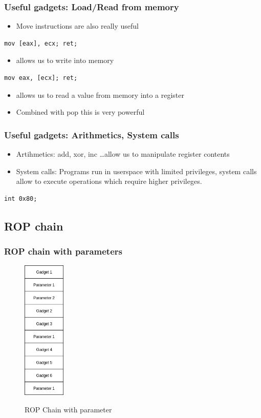 \documentclass[11pt]{beamer}
\begin{document}
\begin{frame}[fragile]
    \frametitle{Useful gadgets: Load/Read from memory}
    \begin{itemize}
        \item Move instructions are also really useful
    \end{itemize}
\begin{lstlisting}[style=result]
mov [eax], ecx; ret;
\end{lstlisting}
    \begin{itemize}
        \item allows us to write into memory
    \end{itemize}
\begin{lstlisting}[style=result]
mov eax, [ecx]; ret;
\end{lstlisting}
    \begin{itemize}
        \item allows us to read a value from memory into a register
        \item Combined with pop this is very powerful
    \end{itemize}
\end{frame}

\begin{frame}[fragile]
    \frametitle{Useful gadgets: Arithmetics, System calls}
    \begin{itemize}
        \item Artihmetics: add, xor, inc \ldots allow us to manipulate register contents
        \item System calls: Programs run in userspace with limited privileges, system calls allow to execute operations which require higher privileges.
    \end{itemize}
\begin{lstlisting}[style=result]
int 0x80;
\end{lstlisting}
\end{frame}
\subsection{ROP chain}
\begin{frame}
    \frametitle{ROP chain with parameters}
    \begin{figure}[h]
        \caption{ROP Chain with parameter}
        \centering
        \includegraphics[width=0.18\textwidth]{./img/gadgetstack.png}\label{gadget2}
    \end{figure}
\end{frame}
\end{document}
